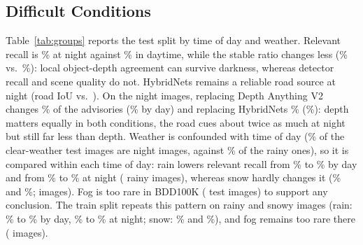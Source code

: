 \documentclass[conference,a4paper]{IEEEtran}
\newif\ifextended
\newcommand{\st}[1]{\textsc{#1}}
\begin{document}
\subsection{Difficult Conditions}
Table~\ref{tab:groups} reports \ifextended the hard-set categories and \fi the test split by time of day and weather. Relevant recall is \TestNightRecRel\% at night against \TestDayRecRel\% in daytime, while the stable ratio changes less (\TestNightStablePct\% vs.\ \TestDayStablePct\%): local object-depth agreement can survive darkness, whereas detector recall and scene quality do not. HybridNets remains a reliable road source at night (road IoU \TestNightRoadIoU{} vs.\ \TestDayRoadIoU{}). On the night images, replacing Depth Anything V2 changes \TestNoDepthNightChangedPct\% of the advisories (\TestNoDepthDayChangedPct\% by day) and replacing HybridNets \TestNoHybNightChangedPct\% (\TestNoHybDayChangedPct\%): depth matters equally in both conditions, the road cues about twice as much at night but still far less than depth. Weather is confounded with time of day (\TestWClearNightPct\% of the clear-weather test images are night images, against \TestWRainyNightPct\% of the rainy ones), so it is compared within each time of day: rain lowers relevant recall from \TestWClearDayRecRel\% to \TestWRainyDayRecRel\% by day and from \TestWClearNightRecRel\% to \TestWRainyNightRecRel\% at night (\TestWRainyImages{} rainy images), whereas snow hardly changes it (\TestWSnowyDayRecRel\% and \TestWSnowyNightRecRel\%; \TestWSnowyImages{} images). Fog is too rare in BDD100K (\TestWFoggyImages{} test images) to support any conclusion.\ifdefined\TrainWRainyNightRecRel{} The train split repeats this pattern on \TrainWRainyImages{} rainy and \TrainWSnowyImages{} snowy images (rain: \TrainWClearDayRecRel\% to \TrainWRainyDayRecRel\% by day, \TrainWClearNightRecRel\% to \TrainWRainyNightRecRel\% at night; snow: \TrainWSnowyDayRecRel\% and \TrainWSnowyNightRecRel\%), and fog remains too rare there (\TrainWFoggyImages{} images).\fi\ifextended\ifdefined\TrainNoHybUnsafe{} On the train images, on which HybridNets was trained (road IoU \TrainRoadIoU{} against \TestRoadIoU), unsafe \st{Clear} occurs on \TrainUnsafe{} of \TrainOccupied{} occupied images and over-caution on \TrainOverPct\% of free-lane images (\TrainNoHybUnsafe{} and \TrainNoHybOverPct\% with HybridNets replaced by the dev road prior).\fi\fi
\end{document}
